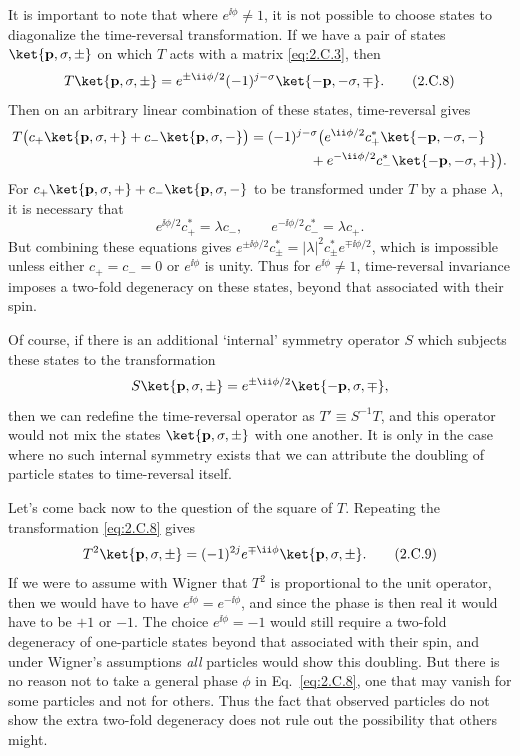 It is important to note that where $e^{\ii\phi}\neq1$, it is not possible to
choose states to diagonalize the time-reversal transformation. If we have a
pair of states $\ket{\mathbf{p},\sigma,\pm}$ on which $T$ acts with a matrix
\eqref{eq:2.C.3}, then
\begin{equation}
  T\ket{\mathbf{p},\sigma,\pm}
    =e^{\pm \ii\phi/2}(-1)^{j-\sigma}
      \ket{-\mathbf{p},-\sigma,\mp}.
  \tag{2.C.8}\label{eq:2.C.8}
\end{equation}
Then on an arbitrary linear combination of these states, time-reversal gives
\begin{align*}
  T\bigl(c_+\ket{\mathbf{p},\sigma,+}
      +c_-\ket{\mathbf{p},\sigma,-}\bigr)
  ={}&(-1)^{j-\sigma}\bigl(
      e^{\ii\phi/2}c_+^*\ket{-\mathbf{p},-\sigma,-} \\
     &\qquad\quad
      +e^{-\ii\phi/2}c_-^*\ket{-\mathbf{p},-\sigma,+}\bigr).
\end{align*}
For $c_+\ket{\mathbf{p},\sigma,+}+c_-\ket{\mathbf{p},\sigma,-}$ to be
transformed under $T$ by a phase $\lambda$, it is necessary that
\begin{equation*}
  e^{\ii\phi/2}c_+^*=\lambda c_-,
  \qquad
  e^{-\ii\phi/2}c_-^*=\lambda c_+.
\end{equation*}
But combining these equations gives
$e^{\pm \ii\phi/2}c_\pm^*=|\lambda|^2c_\pm^*e^{\mp \ii\phi/2}$, which is
impossible unless either $c_+=c_-=0$ or $e^{\ii\phi}$ is unity. Thus for
$e^{\ii\phi}\neq1$, time-reversal invariance imposes a two-fold degeneracy on
these states, beyond that associated with their spin.

Of course, if there is an additional `internal' symmetry operator $S$ which
subjects these states to the transformation
\begin{equation*}
  S\ket{\mathbf{p},\sigma,\pm}
    =e^{\pm \ii\phi/2}\ket{-\mathbf{p},\sigma,\mp},
\end{equation*}
then we can redefine the time-reversal operator as $T'\equiv S^{-1}T$, and
this operator would not mix the states $\ket{\mathbf{p},\sigma,\pm}$ with
one another. It is only in the case where no such internal symmetry exists
that we can attribute the doubling of particle states to time-reversal
itself.

Let's come back now to the question of the square of $T$. Repeating the
transformation \eqref{eq:2.C.8} gives
\begin{equation}
  T^2\ket{\mathbf{p},\sigma,\pm}
    =(-1)^{2j}e^{\mp \ii\phi}\ket{\mathbf{p},\sigma,\pm}.
  \tag{2.C.9}\label{eq:2.C.9}
\end{equation}
If we were to assume with Wigner that $T^2$ is proportional to the unit
operator, then we would have to have $e^{\ii\phi}=e^{-\ii\phi}$, and since the
phase is then real it would have to be $+1$ or $-1$. The choice
$e^{\ii\phi}=-1$ would still require a two-fold degeneracy of one-particle
states beyond that associated with their spin, and under Wigner's assumptions
\emph{all} particles would show this doubling. But there is no reason not to
take a general phase $\phi$ in Eq.~\eqref{eq:2.C.8}, one that may vanish for some
particles and not for others. Thus the fact that observed particles do not
show the extra two-fold degeneracy does not rule out the possibility that
others might.


